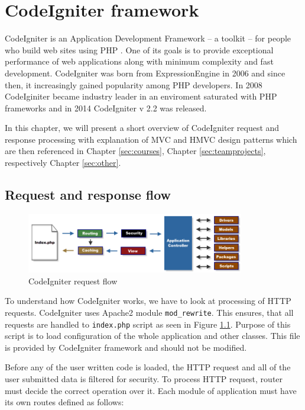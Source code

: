\chapter{CodeIgniter framework}

CodeIgniter is an Application Development Framework -- a toolkit -- for people who build web sites using PHP  \cite{codeigniter}. One of its goals is to provide exceptional performance of web applications along with minimum complexity and fast development. CodeIgniter was born from ExpressionEngine \cite{codeigniter} in 2006 and since then, it increasingly gained popularity among PHP developers. In 2008 CodeIginiter became industry leader in an enviroment saturated with PHP frameworks \cite{codeigniter} and in 2014 CodeIgniter v 2.2 was released. 

In this chapter, we will present a short overview of CodeIgniter request and response processing with explanation of MVC and HMVC design patterns which are then referenced in Chapter \ref{sec:courses}, Chapter \ref{sec:teamprojects}, respectively Chapter \ref{sec:other}.

\section{Request and response flow}

\begin{figure}[h]
    \centering
    \includegraphics[width=0.85\textwidth]{images/codeigniter.png}
    \caption{CodeIgniter request flow}
    \label{codeigniter_flow}
\end{figure}


To understand how CodeIgniter works, we have to look at processing of HTTP requests. CodeIgniter uses Apache2  module \texttt{mod\_rewrite}. This ensures, that all requests are handled to \texttt{index.php} script as seen in Figure \ref{codeigniter_flow}. Purpose of this script is to load configuration of the whole application and other classes. This file is provided by CodeIgniter framework and should not be modified.

Before any of the user written code is loaded, the HTTP request and all of the user submitted data is filtered for security. To process HTTP request, router must decide the correct operation over it. Each module of application must have its own routes defined as follows:


